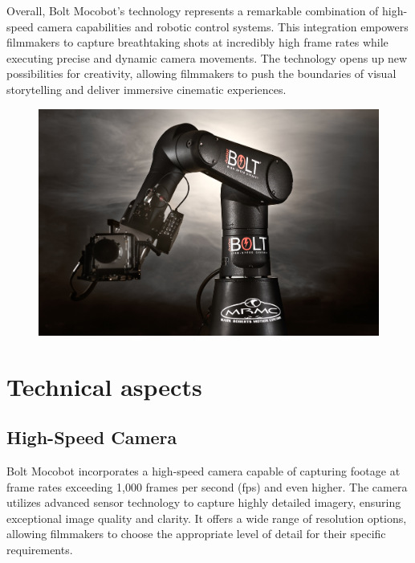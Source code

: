 \documentclass[a4paper,11pt]{report}
\begin{document}
Overall, Bolt Mocobot's technology represents a remarkable combination of high-speed camera capabilities and robotic control systems. This integration empowers filmmakers to capture breathtaking shots at incredibly high frame rates while executing precise and dynamic camera movements. The technology opens up new possibilities for creativity, allowing filmmakers to push the boundaries of visual storytelling and deliver immersive cinematic experiences.
\begin{figure}[h]
	\centering
	\hspace{21pt}
	\includegraphics[width=.70\linewidth]{bolt.jpeg}
	\label{fig:logo.png}
\end{figure}

\chapter{Technical aspects}

\section{High-Speed Camera}
Bolt Mocobot incorporates a high-speed camera capable of capturing footage at frame rates exceeding 1,000 frames per second (fps) and even higher.
The camera utilizes advanced sensor technology to capture highly detailed imagery, ensuring exceptional image quality and clarity.
It offers a wide range of resolution options, allowing filmmakers to choose the appropriate level of detail for their specific requirements.
	
\end{document}
